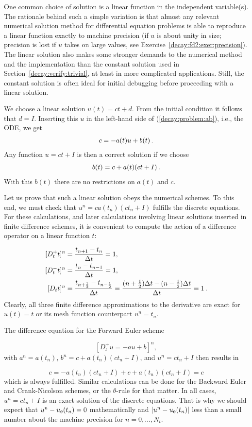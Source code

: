 \documentclass[%
oneside,                 %
final,                   %
10pt]{article}
\begin{document}
One common choice of solution is a linear function in the independent
variable(s). The rationale behind such a simple variation is that
almost any relevant numerical solution method for differential
equation problems is able to reproduce a linear function exactly to
machine precision (if $u$ is about unity in size; precision is lost if
$u$ takes on large values, see Exercise~\ref{decay:fd2:exer:precision}).
The linear solution also makes some stronger demands to the
numerical method and the implementation than the constant solution
used in Section~\ref{decay:verify:trivial}, at least in more
complicated applications. Still, the constant solution is often
ideal for initial debugging before proceeding with a linear solution.

We choose a linear solution $u(t) = ct + d$. From the initial condition it
follows that $d=I$.
Inserting this $u$ in the left-hand side of (\ref{decay:problem:ab}), i.e.,
the ODE, we get
\[ c = -a(t)u + b(t) \tp  \]
Any function $u=ct+I$ is then a correct solution if we choose
\[ b(t) = c + a(t)(ct + I) \tp  \]
With this $b(t)$ there are no restrictions on $a(t)$ and $c$.

Let us prove that such a linear solution obeys the numerical
schemes. To this end, we must check that $u^n = ca(t_n)(ct_n+I)$
fulfills the discrete equations. For these calculations, and
later calculations involving linear solutions inserted in
finite difference schemes, it is convenient to
compute the action of a difference operator on a linear function $t$:

\begin{align}
\lbrack D_t^+ t\rbrack^n &= \frac{t_{n+1}-t_n}{\Delta t}=1,
\label{decay:fd2:Dop:tn:fw}\\ 
\lbrack D_t^- t\rbrack^n &= \frac{t_{n}-t_{n-1}}{\Delta t}=1,
\label{decay:fd2:Dop:tn:bw}\\ 
\lbrack D_t t\rbrack^n &= \frac{t_{n+\half}-t_{n-\half}}{\Delta t}=\frac{(n+\half)\Delta t - (n-\half)\Delta t}{\Delta t}=1
\label{decay:fd2:Dop:tn:cn}
\tp
\end{align}
Clearly, all three finite difference approximations to the derivative are
exact for $u(t)=t$ or its mesh function counterpart $u^n = t_n$.

The difference equation for the Forward Euler scheme

\[ [D^+_t u = -au + b]^n, \]
with $a^n=a(t_n)$, $b^n=c + a(t_n)(ct_n + I)$, and $u^n=ct_n + I$
then results in

\[ c = -a(t_n)(ct_n+I) + c + a(t_n)(ct_n + I) = c \]
which is always fulfilled. Similar calculations can be done for the
Backward Euler and Crank-Nicolson schemes, or the $\theta$-rule for
that matter. In all cases, $u^n=ct_n +I$ is an exact solution of
the discrete equations. That is why we should expect that
$u^n - \uex(t_n) =0$ mathematically and $|u^n - \uex(t_n)|$ less
than a small number about the machine precision for $n=0,\ldots,N_t$.
\end{document}
